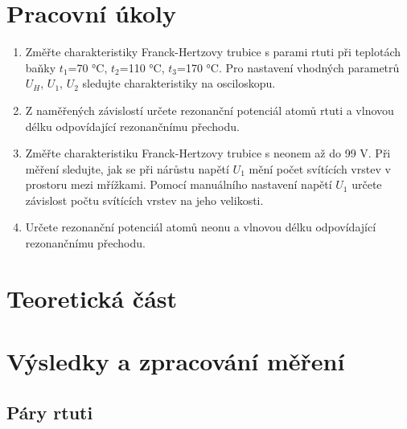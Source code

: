 \section{Pracovní úkoly}

\begin{enumerate}
\item Změřte charakteristiky Franck-Hertzovy trubice s parami rtuti při teplotách baňky $t_1$=70 °C, $t_2$=110 °C, $t_3$=170 °C. Pro nastavení vhodných parametrů $U_H$, $U_1$, $U_2$ sledujte charakteristiky na osciloskopu.

\item Z naměřených závislostí určete rezonanční potenciál atomů rtuti a vlnovou délku odpovídající rezonančnímu přechodu.

\item Změřte charakteristiku Franck-Hertzovy trubice s neonem až do 99 V. Při měření sledujte, jak se při nárůstu napětí $U_1$ mění počet svítících vrstev v prostoru mezi mřížkami. Pomocí manuálního nastavení napětí $U_1$ určete závislost počtu svítících vrstev na jeho velikosti.

\item Určete rezonanční potenciál atomů neonu a vlnovou délku odpovídající rezonančnímu přechodu.

\end{enumerate}

\section{Teoretická část}

\section{Výsledky a zpracování měření}

\subsection{Páry rtuti}

